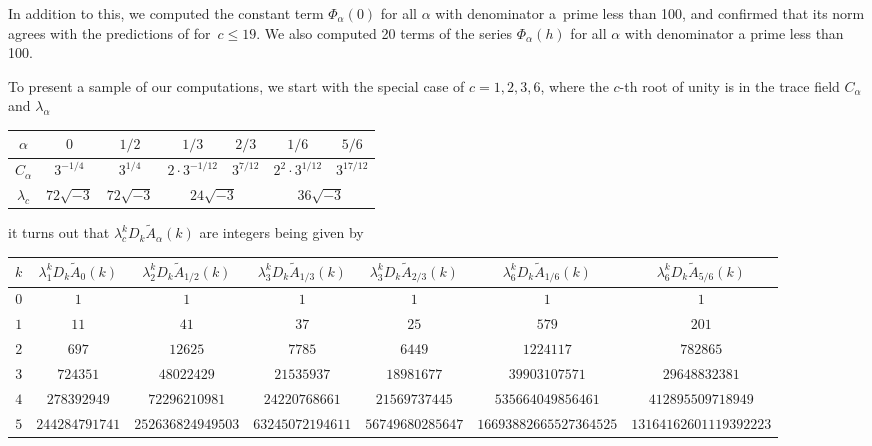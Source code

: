 \documentclass[pdftex]{sigma}
\numberwithin{equation}{section}
\def\wt{\widetilde}
\def\a{\alpha}
\def\a{\alpha}
\def\tiA{\wt A}
\begin{document}
In addition to this, we computed the constant term $\Phi_\a(0)$ for all
$\a$ with denominator a~prime less than 100, and confirmed that its norm
agrees with the predictions of \cite[Section 4.1]{DG2} for~${c \leq 19}$.
We also computed 20 terms of the series $\Phi_\a(h)$ for all $\a$ with
denominator a prime less than 100.

To present a sample of our computations, we start with the special case of
$c=1,2,3,6$, where the $c$-th root of unity is in the trace field
$C_\a$ and $\lambda_\a$
\begin{center}
 \def\arraystretch{1.2}
 \begin{tabular}{|c|c|c|cc|cc|}
\hline
$\a$
& $0$ & $1/2$ & $1/3$ & $2/3$ & $1/6$ & $5/6$ \\
\hline
$C_\a$ & $3^{-{1/4}}$ & $3^{1/4}$ & $2 \cdot 3^{-1/12}$ &
$3^{7/12}$
& $2^2 \cdot 3^{1/12}$ & $3^{17/12}$ \\
\hline
$\lambda_c$ & $72 \sqrt{-3}$ & $72 \sqrt{-3}$ &
\multicolumn{2}{c|}{$24 \sqrt{-3}$}
& \multicolumn{2}{c|}{$36 \sqrt{-3}$} \\
\hline
\end{tabular}
\end{center}
it turns out that $\lambda_c^k D_k \tiA_{\a}(k)$ are integers being given by

\begin{center}
 \def\arraystretch{1.4}\tiny
 \begin{tabular}{|c|c|c|cc|cc|}
\hline
$k$
& $\lambda_1^k D_k \tiA_{0}(k)$ & $\lambda_2^k D_k \tiA_{1/2}(k)$ &
$\lambda_3^k D_k \tiA_{1/3}(k)$ & $\lambda_3^k D_k \tiA_{2/3}(k)$ &
$\lambda_6^k D_k \tiA_{1/6}(k)$ & $\lambda_6^k D_k \tiA_{5/6}(k)$ \\
\hline
$0$ & $1$ & $1$ & $1$ & $1$ & $1$ & $1$ \\
\hline
$1$ & $11$ & $41$ & $37$ & $25$ & $579$ & $201$ \\
\hline
$2$ & $697$ & $12625$ & $7785$ & $6449$ & $1224117$ & $782865$\\
\hline
$3$ & $724351$ & $48022429$ & $21535937$ & $18981677$ & $39903107571$ & $29648832381$ \\
\hline
$4$ & $278392949$ & $72296210981$ & $24220768661$ & $21569737445$ & $535664049856461$ & $412895509718949$
\\
\hline
$5$ & $244284791741$ & $252636824949503$ & $63245072194611$ & $56749680285647$ & $16693882665527364525$
& $13164162601119392223$
\\
\hline
\end{tabular}
\end{center}
\end{document}
